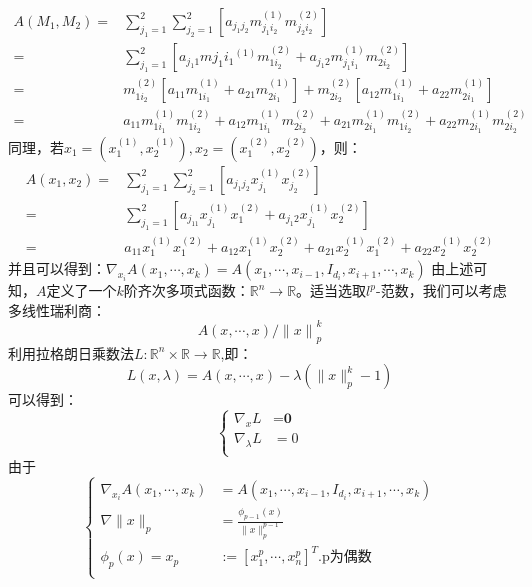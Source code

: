 \documentclass[UTF8]{ctexart}
\begin{document}
\begin{equation}
\begin{split} 
	A(M_1,M_2) =& \sum_{j_1 = 1}^{2} \sum_{j_2 = 1}^{2}[a_{j_1 j_2}m_{j_1 i_2}^{(1)}m_{j_2 i_2}^{(2)}]\\
		  	   =& \sum_{j_1 = 1}^{2} [a_{j_1 1}m{j_1 i_1}^{(1)}m_{1 i_2}^{(2)} + a_{j_1 2}m_{j_1 i_1}^{(1)}m_{2 i_2}^{(2)}]\\
           	   =& m_{1 i_2}^{(2)}[a_{11}m_{1 i_1}^{(1)} + a_{21}m_{2 i_1}^{(1)}] + m_{2 i_2}^{(2)}[a_{12}m_{1 i_1}^{(1)} + a_{22}m_{2 i_1}^{(1)}] \\
           	   =& a_{11}m_{1 i_1}^{(1)}m_{1 i_2}^{(2)} + a_{12}m_{1 i_1}^{(1)}m_{2 i_2}^{(2)} + a_{21}m_{2 i_1}^{(1)}m_{1 i_2}^{(2)} + a_{22}m_{2 i_1}^{(1)}m_{2 i_2}^{(2)}
\end{split}
\end{equation}
同理，若$x_1 = (x_1^{(1)},x_2^{(1)}),x_2 = (x_1^{(2)},x_2^{(2)})$，则：\newline
\begin{equation}
\begin{split}
A{(x_1,x_2)} =& \sum_{j_1 = 1}^{2} \sum_{j_2 = 1}^{2}[a_{j_1 j_2}x_{j_1}^{(1)}x_{j_2}^{(2)}]\\
		   =& \sum_{j_1 = 1}^{2} [a_{j_11}x_{j_1}^{(1)}x_1^{(2)} + a_{j_1 2}x_{j_1}^{(1)}x_2^{(2)}]\\
		   =& a_{11}x_1^{(1)}x_1^{(2)} + a_{12}x_1^{(1)}x_2^{(2)} + a_{21}x_2^{(1)}x_1^{(2)} + a_{22}x_2^{(1)}x_2^{(2)}
\end{split}
\end{equation}
并且可以得到：$\nabla_{x_i}A(x_1,\cdots,x_k) = A(x_1,\cdots,x_{i-1},I_{d_i},x_{i+1},\cdots,x_k)$ \newline
由上述可知，$A$定义了一个$k$阶齐次多项式函数：$\mathbb{R}^n \to \mathbb{R}$。适当选取$l^p$-范数，我们可以考虑多线性瑞利商：
$$A(x,\cdots,x)/{{\|x\|}_p^k}$$
利用拉格朗日乘数法$L:\mathbb{R}^n \times \mathbb{R} \to \mathbb{R}$,即：
$$L(x,\lambda) = A(x,\cdots,x) - \lambda(\|x\|_p^k - 1)$$
可以得到： \newline
\begin{equation}
\left\{
\begin{aligned}
\nabla_xL &= \textbf{0}\\
\nabla_{\lambda}L &= 0\\
\end{aligned}
\right.
\end{equation}
由于\newline
\begin{equation}
\left\{
\begin{aligned} 
\nabla_{x_i}A(x_1,\cdots,x_k) &= A(x_1,\cdots,x_{i-1},I_{d_i},x_{i+1},\cdots,x_k)\\
\nabla \|x\|_p &= \frac{\phi_{p-1}(x)}{\|x\|_p^{p-1}}\\
\phi_p(x) = x_p &:= [x_1^p,\cdots,x_n^p]^T. \text{p为偶数}\\
\end{aligned}
\right.
\end{equation}
\end{document}
